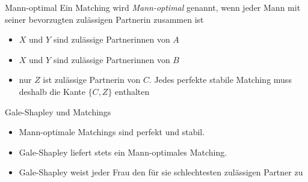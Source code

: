 \documentclass{panikzettel}
\begin{document}
{\begin{thirdboxl}
	\begin{defi}{Mann-optimal}
		Ein Matching wird \emph{Mann-optimal} genannt, wenn jeder Mann mit seiner bevorzugten zulässigen Partnerin zusammen ist
	\end{defi}
\end{thirdboxl}%
\begin{thirdboxm}
	\vspace{0.7cm}	
	\begin{center}
	\end{center}
\end{thirdboxm}%
\begin{thirdboxr}
	\vspace{1.5cm}	
	\begin{itemize}
		\item $X$ und $Y$ sind zulässige Partnerinnen von $A$
		\item $X$ und $Y$ sind zulässige Partnerinnen von $B$
		\item nur $Z$ ist zulässige Partnerin von $C$. Jedes perfekte stabile Matching muss deshalb die Kante $\{C,Z\}$ enthalten
	\end{itemize}
\end{thirdboxr}

\begin{theo}{Gale-Shapley und Matchings}
	\begin{itemize}
		\item Mann-optimale Matchings sind perfekt und stabil.
		\item Gale-Shapley liefert stets ein Mann-optimales Matching.
		\item Gale-Shapley weist jeder Frau den für sie schlechtesten zulässigen Partner zu
	\end{itemize}


\end{theo}}
\end{document}
